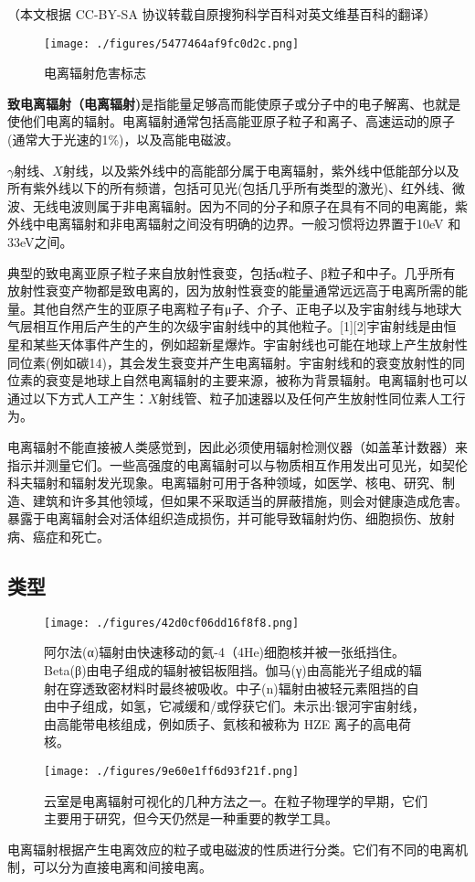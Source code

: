 
（本文根据 CC-BY-SA 协议转载自原搜狗科学百科对英文维基百科的翻译）

\begin{figure}[ht]
\centering
\texttt{[image: ./figures/5477464af9fc0d2c.png]}
\caption{电离辐射危害标志} \label{fig_DLFS_11}
\end{figure}

\textbf{致电离辐射（电离辐射)}是指能量足够高而能使原子或分子中的电子解离、也就是使他们电离的辐射。电离辐射通常包括高能亚原子粒子和离子、高速运动的原子(通常大于光速的1\%)，以及高能电磁波。

$\gamma$射线、$X$射线，以及紫外线中的高能部分属于电离辐射，紫外线中低能部分以及所有紫外线以下的所有频谱，包括可见光(包括几乎所有类型的激光)、红外线、微波、无线电波则属于非电离辐射。因为不同的分子和原子在具有不同的电离能，紫外线中电离辐射和非电离辐射之间没有明确的边界。一般习惯将边界置于10eV 和33eV之间。

典型的致电离亚原子粒子来自放射性衰变，包括α粒子、β粒子和中子。几乎所有放射性衰变产物都是致电离的，因为放射性衰变的能量通常远远高于电离所需的能量。其他自然产生的亚原子电离粒子有μ子、介子、正电子以及宇宙射线与地球大气层相互作用后产生的产生的次级宇宙射线中的其他粒子。[1][2]宇宙射线是由恒星和某些天体事件产生的，例如超新星爆炸。宇宙射线也可能在地球上产生放射性同位素(例如碳14)，其会发生衰变并产生电离辐射。宇宙射线和的衰变放射性的同位素的衰变是地球上自然电离辐射的主要来源，被称为背景辐射。电离辐射也可以通过以下方式人工产生：$X$射线管、粒子加速器以及任何产生放射性同位素人工行为。

电离辐射不能直接被人类感觉到，因此必须使用辐射检测仪器（如盖革计数器）来指示并测量它们。一些高强度的电离辐射可以与物质相互作用发出可见光，如契伦科夫辐射和辐射发光现象。电离辐射可用于各种领域，如医学、核电、研究、制造、建筑和许多其他领域，但如果不采取适当的屏蔽措施，则会对健康造成危害。暴露于电离辐射会对活体组织造成损伤，并可能导致辐射灼伤、细胞损伤、放射病、癌症和死亡。

\subsection{类型}
\begin{figure}[ht]
\centering
\texttt{[image: ./figures/42d0cf06dd16f8f8.png]}
\caption{阿尔法(α)辐射由快速移动的氦-4（4He)细胞核并被一张纸挡住。Beta(β)由电子组成的辐射被铝板阻挡。伽马(γ)由高能光子组成的辐射在穿透致密材料时最终被吸收。中子(n)辐射由被轻元素阻挡的自由中子组成，如氢，它减缓和/或俘获它们。未示出:银河宇宙射线，由高能带电核组成，例如质子、氦核和被称为 HZE 离子的高电荷核。} \label{fig_DLFS_1}
\end{figure}
\begin{figure}[ht]
\centering
\texttt{[image: ./figures/9e60e1ff6d93f21f.png]}
\caption{云室是电离辐射可视化的几种方法之一。在粒子物理学的早期，它们主要用于研究，但今天仍然是一种重要的教学工具。} \label{fig_DLFS_2}
\end{figure}
电离辐射根据产生电离效应的粒子或电磁波的性质进行分类。它们有不同的电离机制，可以分为直接电离和间接电离。

